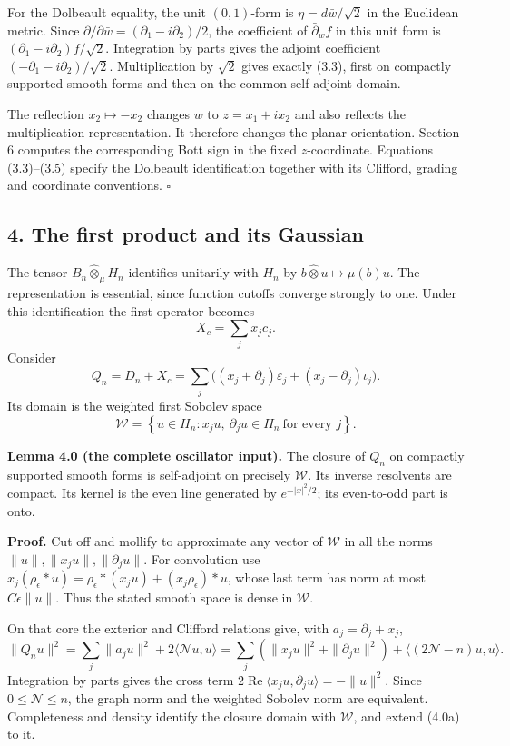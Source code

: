 \documentclass[
  11pt,
]{article}
\begin{document}
For the Dolbeault equality, the unit \((0,1)\)-form is
\(\eta=d\bar w/\sqrt2\) in the Euclidean metric. Since
\(\partial/\partial\bar w=(\partial_1-i\partial_2)/2\), the coefficient
of \(\bar\partial_w f\) in this unit form is
\((\partial_1-i\partial_2)f/\sqrt2\). Integration by parts gives the
adjoint coefficient \((-\partial_1-i\partial_2)/\sqrt2\). Multiplication
by \(\sqrt2\) gives exactly (3.3), first on compactly supported smooth
forms and then on the common self-adjoint domain.

The reflection \(x_2\mapsto-x_2\) changes \(w\) to \(z=x_1+ix_2\) and
also reflects the multiplication representation. It therefore changes
the planar orientation. Section 6 computes the corresponding Bott sign
in the fixed \(z\)-coordinate. Equations (3.3)--(3.5) specify the
Dolbeault identification together with its Clifford, grading and
coordinate conventions. \(\square\)

\subsection{4. The first product and its
Gaussian}\label{the-first-product-and-its-gaussian}

The tensor \(B_n\widehat\otimes_\mu H_n\) identifies unitarily with
\(H_n\) by \(b\widehat\otimes u\mapsto\mu(b)u\). The representation is
essential, since function cutoffs converge strongly to one. Under this
identification the first operator becomes \[
X_c=\sum_jx_jc_j.
\] Consider \[
Q_n=D_n+X_c
=\sum_j\bigl((x_j+\partial_j)\varepsilon_j
 +(x_j-\partial_j)\iota_j\bigr).
\tag{4.1}
\] Its domain is the weighted first Sobolev space \[
\mathcal W=\left\{u\in H_n:
x_ju,\ \partial_ju\in H_n\ \text{for every }j\right\}.
\tag{4.2}
\]

\textbf{Lemma 4.0 (the complete oscillator input).} The closure of
\(Q_n\) on compactly supported smooth forms is self-adjoint on precisely
\(\mathcal W\). Its inverse resolvents are compact. Its kernel is the
even line generated by \(e^{-|x|^2/2}\); its even-to-odd part is onto.

\textbf{Proof.} Cut off and mollify to approximate any vector of
\(\mathcal W\) in all the norms \(\|u\|,\|x_ju\|,\|\partial_ju\|\). For
convolution use
\(x_j(\rho_\epsilon*u)=\rho_\epsilon*(x_ju)+(x_j\rho_\epsilon)*u\),
whose last term has norm at most \(C\epsilon\|u\|\). Thus the stated
smooth space is dense in \(\mathcal W\).

On that core the exterior and Clifford relations give, with
\(a_j=\partial_j+x_j\), \[
\|Q_nu\|^2=\sum_j\|a_ju\|^2+2\langle\mathcal Nu,u\rangle
=\sum_j(\|x_ju\|^2+\|\partial_ju\|^2)
 +\langle(2\mathcal N-n)u,u\rangle.
\tag{4.0a}
\] Integration by parts gives the cross term
\(2\operatorname{Re}\langle x_ju,\partial_ju\rangle=-\|u\|^2\). Since
\(0\leq\mathcal N\leq n\), the graph norm and the weighted Sobolev norm
are equivalent. Completeness and density identify the closure domain
with \(\mathcal W\), and extend (4.0a) to it.
\end{document}
